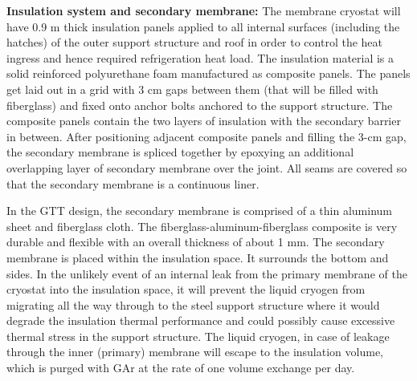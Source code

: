
\textbf{Insulation system and secondary membrane: }
%
The membrane cryostat will have 0.9 m thick insulation panels applied to all internal surfaces (including the hatches) of the outer support structure and roof in order to control the heat ingress and hence required refrigeration heat load.  The insulation material is a solid reinforced polyurethane foam manufactured as composite panels. The panels get laid out in a grid with 3 cm gaps between them (that will be filled with fiberglass) and fixed onto anchor bolts anchored to the support structure. The composite panels contain the two layers of insulation with the secondary barrier in between. After positioning adjacent composite panels and filling 
the 3-cm gap, the secondary membrane is spliced together by epoxying an additional overlapping layer 
of secondary membrane over the joint. All seams are covered so that the secondary membrane is a 
continuous liner.

In the GTT design, the secondary membrane is comprised of a thin aluminum sheet and 
fiberglass cloth. The fiberglass-aluminum-fiberglass composite is very durable and flexible with an 
overall thickness of about 1 mm. The secondary membrane is placed within the insulation space. It 
surrounds the bottom and sides. In the unlikely event of an internal leak from the primary membrane of 
the cryostat into the insulation space, it will prevent the liquid cryogen from migrating all the way 
through to the steel support structure where it would degrade the insulation thermal performance and 
could possibly cause excessive thermal stress in the support structure. The liquid cryogen, in case of 
leakage through the inner (primary) membrane will escape to the insulation volume, which is purged with 
GAr at the rate of one volume exchange per day.

